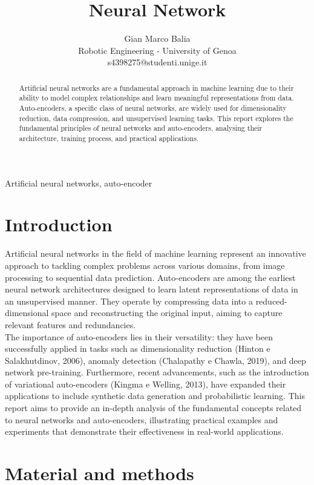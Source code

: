 \documentclass[9pt,technote]{IEEEtran}
\title{Neural Network}
\author{
	Gian Marco Balia\\
	Robotic Engineering - University of Genoa\\
	s4398275@studenti.unige.it
}
\begin{document}
\maketitle

\begin{abstract}
Artificial neural networks are a fundamental approach in machine learning due to their ability to model complex relationships and learn meaningful representations from data. Auto-encoders, a specific class of neural networks, are widely used for dimensionality reduction, data compression, and unsupervised learning tasks. This report explores the fundamental principles of neural networks and auto-encoders, analysing their architecture, training process, and practical applications.
\end{abstract}
\begin{IEEEkeywords}
Artificial neural networks, auto-encoder
\end{IEEEkeywords}

\section{Introduction}
Artificial neural networks in the field of machine learning represent an innovative approach to tackling complex problems across various domains, from image processing to sequential data prediction. Auto-encoders are among the earliest neural network architectures designed to learn latent representations of data in an unsupervised manner. They operate by compressing data into a reduced-dimensional space and reconstructing the original input, aiming to capture relevant features and redundancies. \\
The importance of auto-encoders lies in their versatility: they have been successfully applied in tasks such as dimensionality reduction (Hinton e Salakhutdinov, 2006), anomaly detection (Chalapathy e Chawla, 2019), and deep network pre-training. Furthermore, recent advancements, such as the introduction of variational auto-encoders (Kingma e Welling, 2013), have expanded their applications to include synthetic data generation and probabilistic learning. This report aims to provide an in-depth analysis of the fundamental concepts related to neural networks and auto-encoders, illustrating practical examples and experiments that demonstrate their effectiveness in real-world applications.
\section{Material and methods}
\end{document}
